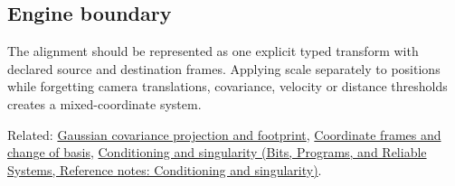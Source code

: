 \subsection{Engine boundary}\label{appendix-5f40b4fea463-engine-boundary}

The alignment should be represented as one explicit typed transform with declared source and destination frames. Applying scale separately to positions while forgetting camera translations, covariance, velocity or distance thresholds creates a mixed-coordinate system.

Related: \hyperref[appendix-24269cb6977c]{Gaussian covariance projection and footprint}, \hyperref[appendix-1bae9457dbc3]{Coordinate frames and change of basis}, \href{../01-Bits-Programs-and-Reliable-Systems/main.pdf\#nameddest=appendix-8f6a01f284a7}{Conditioning and singularity (Bits, Programs, and Reliable Systems, Reference notes: Conditioning and singularity)}.
